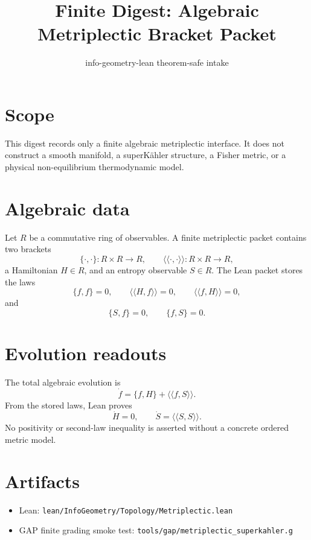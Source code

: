 \documentclass{article}
\title{Finite Digest: Algebraic Metriplectic Bracket Packet}
\author{info-geometry-lean theorem-safe intake}
\date{}
\begin{document}
\maketitle

\section{Scope}
This digest records only a finite algebraic metriplectic interface.  It does not
construct a smooth manifold, a superKähler structure, a Fisher metric, or a
physical non-equilibrium thermodynamic model.

\section{Algebraic data}
Let $R$ be a commutative ring of observables.  A finite metriplectic packet
contains two brackets
\[
\{\cdot,\cdot\}:R\times R\to R,
\qquad
\langle\!\langle\cdot,\cdot\rangle\!\rangle:R\times R\to R,
\]
a Hamiltonian $H\in R$, and an entropy observable $S\in R$.  The Lean packet
stores the laws
\[
\{f,f\}=0,
\qquad
\langle\!\langle H,f\rangle\!\rangle=0,
\qquad
\langle\!\langle f,H\rangle\!\rangle=0,
\]
and
\[
\{S,f\}=0,
\qquad
\{f,S\}=0.
\]

\section{Evolution readouts}
The total algebraic evolution is
\[
\dot f=\{f,H\}+\langle\!\langle f,S\rangle\!\rangle.
\]
From the stored laws, Lean proves
\[
\dot H=0,
\qquad
\dot S=\langle\!\langle S,S\rangle\!\rangle.
\]
No positivity or second-law inequality is asserted without a concrete ordered
metric model.

\section{Artifacts}
\begin{itemize}
\item Lean: \texttt{lean/InfoGeometry/Topology/Metriplectic.lean}
\item GAP finite grading smoke test: \texttt{tools/gap/metriplectic\_superkahler.g}
\end{itemize}
\end{document}

